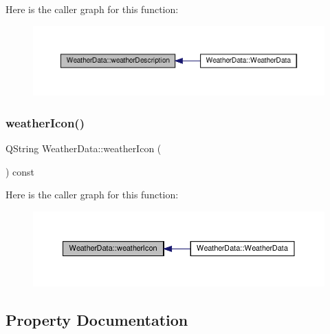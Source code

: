 Here is the caller graph for this function\+:
\nopagebreak
\begin{figure}[H]
\begin{center}
\leavevmode
\includegraphics[width=350pt]{class_weather_data_a63a3528697c8681bd32d4d170ec91f76_icgraph}
\end{center}
\end{figure}
\mbox{\label{class_weather_data_a5baf2d9cc08741d7af4a07d61df95ee4}} 
\subsubsection{\texorpdfstring{weather\+Icon()}{weatherIcon()}}
{\footnotesize\ttfamily Q\+String Weather\+Data\+::weather\+Icon (\begin{DoxyParamCaption}{ }\end{DoxyParamCaption}) const}

Here is the caller graph for this function\+:
\nopagebreak
\begin{figure}[H]
\begin{center}
\leavevmode
\includegraphics[width=350pt]{class_weather_data_a5baf2d9cc08741d7af4a07d61df95ee4_icgraph}
\end{center}
\end{figure}


\subsection{Property Documentation}
\mbox{\label{class_weather_data_a483043396f44ae957716ebb005644d0d}} 
